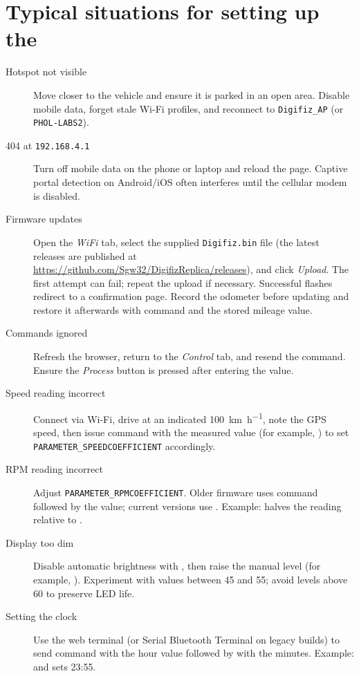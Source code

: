 \chapter{Typical situations for setting up the \ReplicaNextLong{}}\label{ch:replica-next-scenarios}

\begin{description}
    \item[Hotspot not visible] Move closer to the vehicle and ensure it is parked in an open area. Disable mobile data, forget stale Wi-Fi profiles, and reconnect to \texttt{Digifiz\_AP} (or \texttt{PHOL-LABS2}).
    \item[404 at \texttt{192.168.4.1}] Turn off mobile data on the phone or laptop and reload the page. Captive portal detection on Android/iOS often interferes until the cellular modem is disabled.
    \item[Firmware updates] Open the \emph{WiFi} tab, select the supplied \texttt{Digifiz.bin} file (the latest releases are published at \url{https://github.com/Sgw32/DigifizReplica/releases}), and click \emph{Upload}. The first attempt can fail; repeat the upload if necessary. Successful flashes redirect to a confirmation page. Record the odometer before updating and restore it afterwards with command  and the stored mileage value.
    \item[Commands ignored] Refresh the browser, return to the \emph{Control} tab, and resend the command. Ensure the \emph{Process} button is pressed after entering the value.
    \item[Speed reading incorrect] Connect via Wi-Fi, drive at an indicated \SI{100}{\kilo\metre\per\hour}, note the GPS speed, then issue command  with the measured value (for example, ) to set \texttt{PARAMETER\_SPEEDCOEFFICIENT} accordingly.
    \item[RPM reading incorrect] Adjust \texttt{PARAMETER\_RPMCOEFFICIENT}. Older firmware uses command  followed by the value; current versions use . Example:  halves the reading relative to .
    \item[Display too dim] Disable automatic brightness with , then raise the manual level (for example, ). Experiment with values between 45 and 55; avoid levels above 60 to preserve LED life.
    \item[Setting the clock] Use the web terminal (or Serial Bluetooth Terminal on legacy builds) to send command  with the hour value followed by  with the minutes. Example:  and  sets 23:55.

\end{description}
